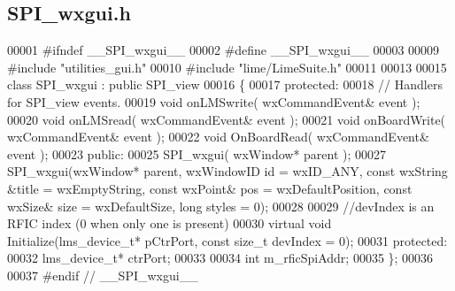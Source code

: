 \subsection{S\+P\+I\+\_\+wxgui.\+h}
\label{SPI__wxgui_8h_source}

\begin{DoxyCode}
00001 \textcolor{preprocessor}{#ifndef \_\_SPI\_wxgui\_\_}
00002 \textcolor{preprocessor}{#define \_\_SPI\_wxgui\_\_}
00003 
00009 \textcolor{preprocessor}{#include "utilities_gui.h"}
00010 \textcolor{preprocessor}{#include "lime/LimeSuite.h"}
00011 
00013 
00015 \textcolor{keyword}{class }SPI_wxgui : \textcolor{keyword}{public} SPI_view
00016 \{
00017     \textcolor{keyword}{protected}:
00018         \textcolor{comment}{// Handlers for SPI\_view events.}
00019         \textcolor{keywordtype}{void} onLMSwrite( wxCommandEvent& event );
00020         \textcolor{keywordtype}{void} onLMSread( wxCommandEvent& event );
00021         \textcolor{keywordtype}{void} onBoardWrite( wxCommandEvent& event );
00022         \textcolor{keywordtype}{void} OnBoardRead( wxCommandEvent& event );
00023     \textcolor{keyword}{public}:
00025         SPI_wxgui( wxWindow* parent );
00027         SPI_wxgui(wxWindow* parent, wxWindowID \textcolor{keywordtype}{id} = wxID\_ANY, \textcolor{keyword}{const} wxString &title = wxEmptyString, \textcolor{keyword}{const} 
      wxPoint& pos = wxDefaultPosition, \textcolor{keyword}{const} wxSize& size = wxDefaultSize, \textcolor{keywordtype}{long} styles = 0);
00028 
00029         \textcolor{comment}{//devIndex is an RFIC index (0 when only one is present)}
00030         \textcolor{keyword}{virtual} \textcolor{keywordtype}{void} Initialize(lms_device_t* pCtrPort, \textcolor{keyword}{const} \textcolor{keywordtype}{size\_t} devIndex = 0);
00031     \textcolor{keyword}{protected}:
00032         lms_device_t* ctrPort;
00033 
00034         \textcolor{keywordtype}{int} m_rficSpiAddr;
00035 \};
00036 
00037 \textcolor{preprocessor}{#endif // \_\_SPI\_wxgui\_\_}
\end{DoxyCode}
